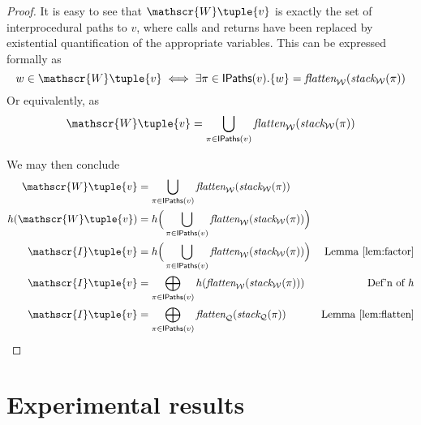 \begin{proof}
     It is easy to see that $\mathscr{W}\tuple{v}$ is exactly the set of
     interprocedural paths to $v$, where calls and returns have been replaced
     by existential quantification of the appropriate variables.  This can be
     expressed formally as
     \[w \in \mathscr{W}\tuple{v} \iff \exists \pi \in \mathsf{IPaths}(v). \{w\} = \textit{flatten}_{\mathcal{W}}(\textit{stack}_{\mathcal{W}}(\pi))\]
     Or equivalently, as
     \[ \mathscr{W}\tuple{v} = \bigcup_{\pi \in \mathsf{IPaths}(v)} \textit{flatten}_{\mathcal{W}}(\textit{stack}_{\mathcal{W}}(\pi)) \]

     We may then conclude
     \begin{align*}
      \mathscr{W}\tuple{v} &= \bigcup_{\pi \in \mathsf{IPaths}(v)} \textit{flatten}_{\mathcal{W}}(\textit{stack}_{\mathcal{W}}(\pi))\\
      h(\mathscr{W}\tuple{v}) &= h\Big(\bigcup_{\pi \in \mathsf{IPaths}(v)} \textit{flatten}_{\mathcal{W}}(\textit{stack}_{\mathcal{W}}(\pi))\Big)\\
      \mathscr{I}\tuple{v} &= h\Big(\bigcup_{\pi \in \mathsf{IPaths}(v)} \textit{flatten}_{\mathcal{W}}(\textit{stack}_{\mathcal{W}}(\pi))\Big) & \text{Lemma~\ref{lem:factor}}\\
      \mathscr{I}\tuple{v} &= \bigoplus_{\pi \in \mathsf{IPaths}(v)} h(\textit{flatten}_{\mathcal{W}}(\textit{stack}_{\mathcal{W}}(\pi))) & \text{Def'n of } h\\
      \mathscr{I}\tuple{v} &= \bigoplus_{\pi \in \mathsf{IPaths}(v)} \textit{flatten}_{\mathcal{Q}}(\textit{stack}_{\mathcal{Q}}(\pi)) & \text{Lemma~\ref{lem:flatten}}
     \end{align*}
   \end{proof}











\section{Experimental results}

